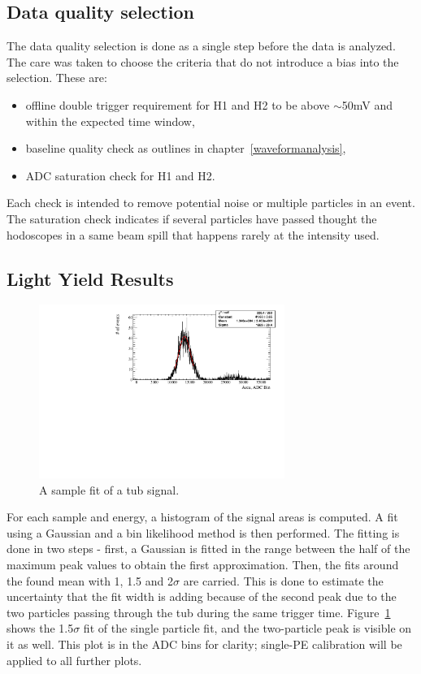 \documentclass[preprint,12pt]{elsarticle}
\begin{document}
\subsection{Data quality selection}
\label{dataqualitysection}

The data quality selection is done as a single step before the data is analyzed. The care was taken to choose the criteria that do not introduce a bias into the selection. These are:

\begin{itemize}
	\item offline double trigger requirement for H1 and H2 to be above $\sim$50mV and within the expected time window,
	\item baseline quality check as outlines in chapter~\ref{waveformanalysis},
	\item ADC saturation check for H1 and H2.
\end{itemize}

Each check is intended to remove potential noise or multiple particles in an event. The saturation check indicates if several particles have passed thought the hodoscopes in a same beam spill that happens rarely at the intensity used.


\subsection{Light Yield Results}
\label{lightyieldsection}

\begin{figure}[ht]
	\centering
		\includegraphics[width=80mm]{sampletubsignalfit.pdf}
	\caption{A sample fit of a tub signal.}
	\label{sampletubsignalfit}
\end{figure}

For each sample and energy, a histogram of the signal areas is computed. A fit using a Gaussian and a bin likelihood method is then performed. The fitting is done in two steps - first, a Gaussian is fitted in the range between the half of the maximum peak values to obtain the first approximation. Then, the fits around the found mean with 1, 1.5 and 2$\sigma$ are carried. This is done to estimate the uncertainty that the fit width is adding because of the second peak due to the two particles passing through the tub during the same trigger time. 
Figure~\ref{sampletubsignalfit} shows the 1.5$\sigma$ fit of the single particle fit, and the two-particle peak is visible on it as well. This plot is in the ADC bins for clarity; single-PE calibration will be applied to all further plots.
\end{document}
